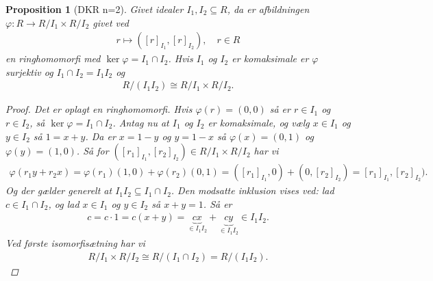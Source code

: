 \documentclass[10pt,twoside,openany,final]{memoir}
\theoremstyle{break}
\newtheorem{proposition}[section]{Proposition}
\theoremstyle{Break}
\begin{document}
\begin{proposition}[DKR n=2]
Givet idealer $I_1, I_2 \subseteq R$, da er afbildningen $\varphi \colon R\to R/I_1 \times R/I_2$ givet ved
\begin{align*}
r \mapsto ([r]_{I_1},[r]_{I_2}), \quad r \in R
\end{align*}
en ringhomomorfi med $\ker \varphi = I_1 \cap I_2$. Hvis $I_1$ og $I_2$ er komaksimale er $\varphi$ surjektiv og $I_1 \cap I_2 = I_1 I_2$ og
\begin{align*}
R /(I_1 I_2) \cong R/I_1 \times R/I_2.
\end{align*}
\begin{proof}
Det er oplagt en ringhomomorfi. Hvis $\varphi(r)=(0,0)$ så er $r \in I_1$ og $r \in I_2$, så $\ker \varphi = I_1 \cap I_2$. Antag nu at $I_1$ og $I_2$ er komaksimale, og vælg $x \in I_1$ og $y \in I_2$ så $1=x+y$. Da er $x=1-y$ og $y=1-x$ så $\varphi(x)=(0,1)$ og $\varphi(y)=(1,0)$. Så for $([r_1]_{I_1},[r_2]_{I_2}) \in R/I_1 \times R/I_2$ har vi
\begin{align*}
\varphi(r_1y + r_2x)=\varphi(r_1)(1,0)+\varphi(r_2)(0,1)=([r_1]_{I_1},0)+(0,[r_2]_{I_2})=[r_1]_{I_1},[r_2]_{I_2}).
\end{align*}
Og der gælder generelt at $I_1 I_2 \subseteq I_1 \cap I_2$. Den modsatte inklusion vises ved: lad $c \in I_1 \cap I_2$, og lad $x \in I_1$ og $y \in I_2$ så $x+y=1$. Så er
\begin{align*}
c=c\cdot 1 = c(x+y)=\underbrace{cx}_{\in I_1 I_2} +\underbrace{cy}_{\in I_1 I_2} \in I_1 I_2.
\end{align*}
Ved første isomorfisætning har vi 
\begin{align*}
R/I_1 \times R/I_2 \cong R/(I_1 \cap I_2)=R/(I_1I_2).
\end{align*}
\end{proof}
\end{proposition}
\end{document}
